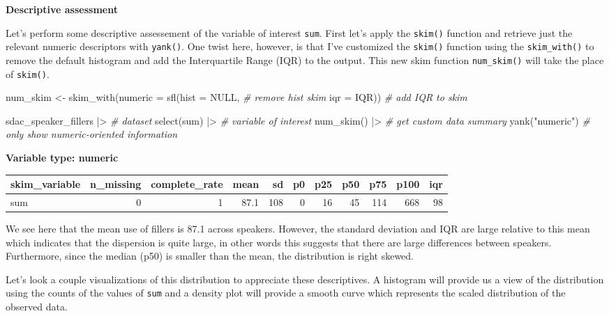 \documentclass[
  letterpaper,
]{scrbook}
\newenvironment{Shaded}{\begin{snugshade}}{\end{snugshade}}
\newcommand{\AttributeTok}[1]{\textcolor[rgb]{0.00,0.00,0.00}{#1}}
\newcommand{\CommentTok}[1]{\textcolor[rgb]{0.00,0.00,0.00}{\textit{#1}}}
\newcommand{\ConstantTok}[1]{\textcolor[rgb]{0.00,0.00,0.00}{#1}}
\newcommand{\FunctionTok}[1]{\textcolor[rgb]{0.00,0.00,0.00}{#1}}
\newcommand{\NormalTok}[1]{\textcolor[rgb]{0.00,0.00,0.00}{#1}}
\newcommand{\OtherTok}[1]{\textcolor[rgb]{0.00,0.00,0.00}{#1}}
\newcommand{\SpecialCharTok}[1]{\textcolor[rgb]{0.00,0.00,0.00}{#1}}
\newcommand{\StringTok}[1]{\textcolor[rgb]{0.00,0.00,0.00}{#1}}
\begin{document}
\textbf{Descriptive assessment}

Let's perform some descriptive assessement of the variable of interest
\texttt{sum}. First let's apply the \texttt{skim()} function and
retrieve just the relevant numeric descriptors with \texttt{yank()}. One
twist here, however, is that I've customized the \texttt{skim()}
function using the \texttt{skim\_with()} to remove the default histogram
and add the Interquartile Range (IQR) to the output. This new skim
function \texttt{num\_skim()} will take the place of \texttt{skim()}.

\begin{Shaded}
\begin{Highlighting}[]
\NormalTok{num\_skim }\OtherTok{\textless{}{-}} 
  \FunctionTok{skim\_with}\NormalTok{(}\AttributeTok{numeric =} \FunctionTok{sfl}\NormalTok{(}\AttributeTok{hist =} \ConstantTok{NULL}\NormalTok{, }\CommentTok{\# remove hist skim}
                                   \AttributeTok{iqr =}\NormalTok{ IQR)) }\CommentTok{\# add IQR to skim}

\NormalTok{sdac\_speaker\_fillers }\SpecialCharTok{|\textgreater{}} \CommentTok{\# dataset}
  \FunctionTok{select}\NormalTok{(sum) }\SpecialCharTok{|\textgreater{}} \CommentTok{\# variable of interest}
  \FunctionTok{num\_skim}\NormalTok{() }\SpecialCharTok{|\textgreater{}} \CommentTok{\# get custom data summary}
  \FunctionTok{yank}\NormalTok{(}\StringTok{"numeric"}\NormalTok{) }\CommentTok{\# only show numeric{-}oriented information}
\end{Highlighting}
\end{Shaded}

\textbf{Variable type: numeric}

\begin{tabular}{l|r|r|r|r|r|r|r|r|r|r}
\hline
skim\_variable & n\_missing & complete\_rate & mean & sd & p0 & p25 & p50 & p75 & p100 & iqr\\
\hline
sum & 0 & 1 & 87.1 & 108 & 0 & 16 & 45 & 114 & 668 & 98\\
\hline
\end{tabular}

We see here that the mean use of fillers is 87.1 across speakers.
However, the standard deviation and IQR are large relative to this mean
which indicates that the dispersion is quite large, in other words this
suggests that there are large differences between speakers. Furthermore,
since the median (p50) is smaller than the mean, the distribution is
right skewed.

Let's look a couple visualizations of this distribution to appreciate
these descriptives. A histogram will provide us a view of the
distribution using the counts of the values of \texttt{sum} and a
density plot will provide a smooth curve which represents the scaled
distribution of the observed data.
\end{document}
